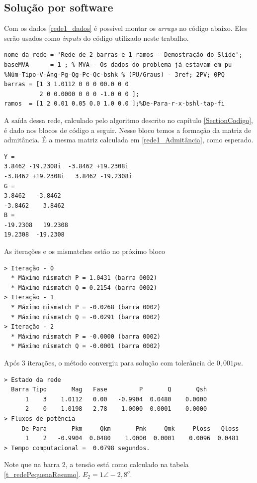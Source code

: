 \subsection{Solução por software}
Com os dados \ref{rede1_dados} é possivel montar os \textit{arrays} no código abaixo. Eles serão usados como \textit{inputs} do código utilizado neste trabalho. 
\begin{verbatim}
nome_da_rede = 'Rede de 2 barras e 1 ramos - Demostração do Slide';
baseMVA      = 1 ; % MVA - Os dados do problema já estavam em pu
%Núm-Tipo-V-Âng-Pg-Qg-Pc-Qc-bshk % (PU/Graus) - 3ref; 2PV; 0PQ
barras = [1 3 1.0112 0 0 0 00.0 0 0
          2 0 0.0000 0 0 0 -1.0 0 0 ];
ramos  = [1 2 0.01 0.05 0.0 1.0 0.0 ];%De-Para-r-x-bshl-tap-fi
\end{verbatim}
A saída dessa rede, calculado pelo algoritmo descrito no capítulo \ref{SectionCodigo}, é dado nos blocos de código a seguir.
Nesse bloco temos a formação da matriz de admitância. É a mesma matriz calculada em \ref{rede1_Admitância}, como esperado.
\begin{verbatim}
Y =
3.8462 -19.2308i  -3.8462 +19.2308i
-3.8462 +19.2308i   3.8462 -19.2308i
G =
3.8462   -3.8462
-3.8462    3.8462
B =
-19.2308   19.2308
19.2308  -19.2308
\end{verbatim}
As iterações e os mismatches estão no próximo bloco
\begin{verbatim}
> Iteração - 0
  * Máximo mismatch P = 1.0431 (barra 0002)
  * Máximo mismatch Q = 0.2154 (barra 0002)
> Iteração - 1
  * Máximo mismatch P = -0.0268 (barra 0002)
  * Máximo mismatch Q = -0.0291 (barra 0002)
> Iteração - 2
  * Máximo mismatch P = -0.0000 (barra 0002)
  * Máximo mismatch Q = -0.0001 (barra 0002)
\end{verbatim}
Após 3 iterações, o método convergiu para solução com tolerância de $0,001pu$.
\begin{verbatim}
> Estado da rede
  Barra Tipo       Mag   Fase         P       Q       Qsh
      1    3    1.0112   0.00   -0.9904  0.0480    0.0000 
      2    0    1.0198   2.78    1.0000  0.0001    0.0000 
> Fluxos de potência
     De Para       Pkm     Qkm       Pmk     Qmk     Ploss   Qloss
      1    2   -0.9904  0.0480    1.0000  0.0001    0.0096  0.0481
> Tempo computacional =  0.0798 segundos.
\end{verbatim}
Note que na barra $2$, a tensão está como calculado na tabela \ref{t_redePequenaResumo}. $E_2=1 \angle -2,8^o$.



